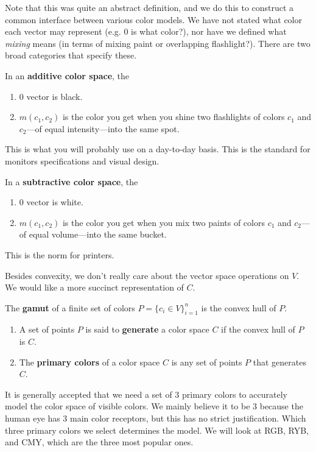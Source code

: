Note that this was quite an abstract definition, and we do this to construct a common interface between various color models. We have not stated what color each vector may represent (e.g. $0$ is what color?), nor have we defined what \textit{mixing} means (in terms of mixing paint or overlapping flashlight?). There are two broad categories that specify these. 

\begin{definition} 
  In an \textbf{additive color space}, the 
  \begin{enumerate}
    \item $0$ vector is black. 
    \item $m(c_1, c_2)$ is the color you get when you shine two flashlights of colors $c_1$ and $c_2$---of equal intensity---into the same spot. 
  \end{enumerate}
  This is what you will probably use on a day-to-day basis. This is the standard for monitors specifications and visual design. 
\end{definition}

\begin{definition}
  In a \textbf{subtractive color space}, the 
  \begin{enumerate}
    \item $0$ vector is white. 
    \item $m(c_1, c_2)$ is the color you get when you mix two paints of colors $c_1$ and $c_2$---of equal volume---into the same bucket. 
  \end{enumerate} 
  This is the norm for printers. 
\end{definition} 

Besides convexity, we don't really care about the vector space operations on $V$. We would like a more succinct representation of $C$. 

\begin{definition}[Gamut]
  The \textbf{gamut} of a finite set of colors $P = \{c_i \in V \}_{i=1}^n $ is the convex hull of $P$. 
  \begin{enumerate}
    \item A set of points $P$ is said to \textbf{generate} a color space $C$ if the convex hull of $P$ is $C$. 
    \item The \textbf{primary colors} of a color space $C$ is any set of points $P$ that generates $C$. 
  \end{enumerate}
\end{definition} 

It is generally accepted that we need a set of 3 primary colors to accurately model the color space of visible colors. We mainly believe it to be 3 because the human eye has 3 main color receptors, but this has no strict justification. Which three primary colors we select determines the model. We will look at RGB, RYB, and CMY, which are the three most popular ones. 

